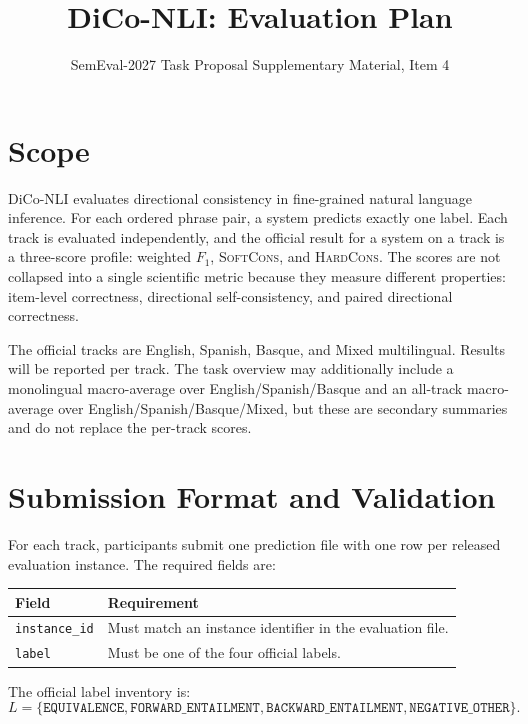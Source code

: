 \documentclass[10pt]{article}
\title{\vspace{-1.2cm}DiCo-NLI: Evaluation Plan}
\author{SemEval-2027 Task Proposal Supplementary Material, Item 4}
\date{\vspace{-0.7cm}}
\newcommand{\SoftCons}{\textsc{SoftCons}}
\newcommand{\HardCons}{\textsc{HardCons}}
\begin{document}
\maketitle
\vspace{-0.8cm}

\section{Scope}

DiCo-NLI evaluates directional consistency in fine-grained natural language inference.
For each ordered phrase pair, a system predicts exactly one label.
Each track is evaluated independently, and the official result for a system on a track is a three-score profile: weighted $F_1$, \SoftCons{}, and \HardCons{}.
The scores are not collapsed into a single scientific metric because they measure different properties: item-level correctness, directional self-consistency, and paired directional correctness.

The official tracks are English, Spanish, Basque, and Mixed multilingual.
Results will be reported per track.
The task overview may additionally include a monolingual macro-average over English/Spanish/Basque and an all-track macro-average over English/Spanish/Basque/Mixed, but these are secondary summaries and do not replace the per-track scores.

\section{Submission Format and Validation}

For each track, participants submit one prediction file with one row per released evaluation instance.
The required fields are:

\begin{center}
\small
\begin{tabular}{ll}
\toprule
Field & Requirement \\
\midrule
\texttt{instance\_id} & Must match an instance identifier in the evaluation file. \\
\texttt{label} & Must be one of the four official labels. \\
\bottomrule
\end{tabular}
\end{center}

The official label inventory is:
\[
L=\{\texttt{EQUIVALENCE},\texttt{FORWARD\_ENTAILMENT},
\texttt{BACKWARD\_ENTAILMENT},\texttt{NEGATIVE\_OTHER}\}.
\]
\end{document}
